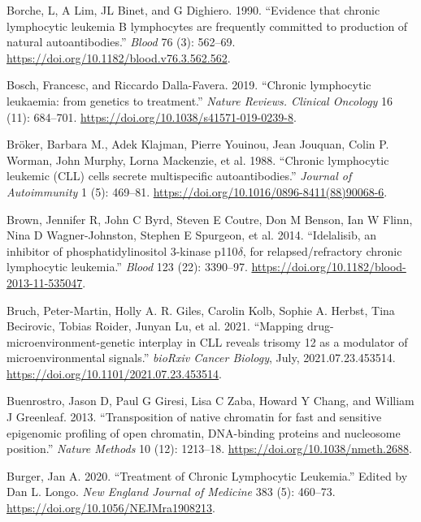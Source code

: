 \documentclass[11pt, a4paper, twosided]{book}
\newenvironment{CSLReferences}%
  {}%
  {\par}
\begin{document}
\begin{CSLReferences}{1}{0}
\leavevmode{}%
Borche, L, A Lim, JL Binet, and G Dighiero. 1990. {``{Evidence that chronic lymphocytic leukemia B lymphocytes are frequently committed to production of natural autoantibodies}.''} \emph{Blood} 76 (3): 562--69. \url{https://doi.org/10.1182/blood.v76.3.562.562}.

\leavevmode{}%
Bosch, Francesc, and Riccardo Dalla-Favera. 2019. {``{Chronic lymphocytic leukaemia: from genetics to treatment.}''} \emph{Nature Reviews. Clinical Oncology} 16 (11): 684--701. \url{https://doi.org/10.1038/s41571-019-0239-8}.

\leavevmode{}%
Bröker, Barbara M., Adek Klajman, Pierre Youinou, Jean Jouquan, Colin P. Worman, John Murphy, Lorna Mackenzie, et al. 1988. {``{Chronic lymphocytic leukemic (CLL) cells secrete multispecific autoantibodies}.''} \emph{Journal of Autoimmunity} 1 (5): 469--81. \url{https://doi.org/10.1016/0896-8411(88)90068-6}.

\leavevmode{}%
Brown, Jennifer R, John C Byrd, Steven E Coutre, Don M Benson, Ian W Flinn, Nina D Wagner-Johnston, Stephen E Spurgeon, et al. 2014. {``{Idelalisib, an inhibitor of phosphatidylinositol 3-kinase p110\(\delta\), for relapsed/refractory chronic lymphocytic leukemia}.''} \emph{Blood} 123 (22): 3390--97. \url{https://doi.org/10.1182/blood-2013-11-535047}.

\leavevmode{}%
Bruch, Peter-Martin, Holly A. R. Giles, Carolin Kolb, Sophie A. Herbst, Tina Becirovic, Tobias Roider, Junyan Lu, et al. 2021. {``{Mapping drug-microenvironment-genetic interplay in CLL reveals trisomy 12 as a modulator of microenvironmental signals}.''} \emph{bioRxiv Cancer Biology}, July, 2021.07.23.453514. \url{https://doi.org/10.1101/2021.07.23.453514}.

\leavevmode{}%
Buenrostro, Jason D, Paul G Giresi, Lisa C Zaba, Howard Y Chang, and William J Greenleaf. 2013. {``{Transposition of native chromatin for fast and sensitive epigenomic profiling of open chromatin, DNA-binding proteins and nucleosome position}.''} \emph{Nature Methods} 10 (12): 1213--18. \url{https://doi.org/10.1038/nmeth.2688}.

\leavevmode{}%
Burger, Jan A. 2020. {``{Treatment of Chronic Lymphocytic Leukemia}.''} Edited by Dan L. Longo. \emph{New England Journal of Medicine} 383 (5): 460--73. \url{https://doi.org/10.1056/NEJMra1908213}.


\end{CSLReferences}
\end{document}
